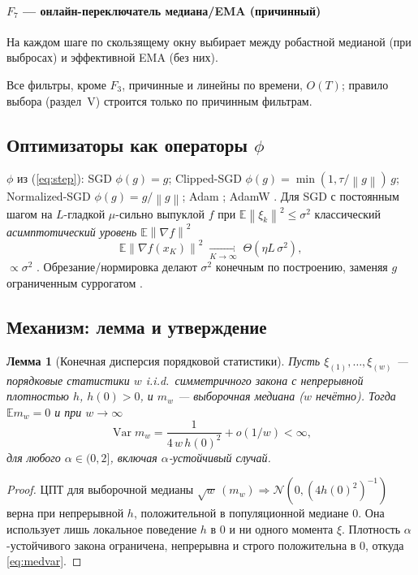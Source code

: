 \documentclass[conference]{IEEEtran}
\theoremstyle{plain}
\newtheorem{lemma}{Лемма}
\theoremstyle{definition}
\newcommand{\E}{\mathbb{E}}
\newcommand{\norm}[1]{\left\lVert#1\right\rVert}
\DeclareMathOperator{\Var}{Var}
\begin{document}
\paragraph*{$F_7$ --- онлайн-переключатель медиана/EMA (причинный)}
На каждом шаге по скользящему окну выбирает между робастной медианой
(при выбросах) и эффективной EMA (без них).

\medskip\noindent
Все фильтры, кроме $F_3$, причинные и линейны по времени, $O(T)$;
правило выбора (раздел~V) строится только по причинным фильтрам.

\subsection{Оптимизаторы как операторы $\phi$}
$\phi$ из (\ref{eq:step}): SGD $\phi(g)=g$; Clipped-SGD
$\phi(g)=\min(1,\tau/\norm{g})\,g$; Normalized-SGD $\phi(g)=g/\norm{g}$;
Adam \cite{kingma2015adam}; AdamW \cite{loshchilov2019adamw}. Для SGD с
постоянным шагом на $L$-гладкой $\mu$-сильно выпуклой $f$ при
$\E\norm{\xi_k}^2\le\sigma^2$ классический \emph{асимптотический уровень} $\E\norm{\nabla f}^2$
\begin{equation}
\E\norm{\nabla f(x_K)}^2\;\xrightarrow[K\to\infty]{}\;
\Theta(\eta L\,\sigma^2), \label{eq:floor}
\end{equation}
$\propto\sigma^2$ \cite{robbins1951sgd}. Обрезание/нормировка делают
$\sigma^2$ конечным по построению, заменяя $g$ ограниченным суррогатом
\cite{gorbunov2020clipping,cutkosky2021high,armacki2024nonlinear}.

\subsection{Механизм: лемма и утверждение}

\begin{lemma}[Конечная дисперсия порядковой статистики]
\label{lem:median}
Пусть $\xi_{(1)},\dots,\xi_{(w)}$ --- порядковые статистики $w$ i.i.d.\
симметричного закона с непрерывной плотностью $h$, $h(0)>0$, и $m_w$ ---
выборочная медиана ($w$ нечётно). Тогда $\E m_w=0$ и при $w\to\infty$
\begin{equation}
\Var m_w=\frac{1}{4\,w\,h(0)^2}+o(1/w)<\infty,
\label{eq:medvar}
\end{equation}
для \emph{любого} $\alpha\in(0,2]$, включая $\alpha$-устойчивый случай.
\end{lemma}
\begin{proof}
ЦПТ для выборочной медианы $\sqrt{w}\,(m_w)\Rightarrow
\mathcal N(0,(4h(0)^2)^{-1})$ верна при непрерывной $h$, положительной
в популяционной медиане $0$. Она использует лишь локальное поведение
$h$ в $0$ и ни одного момента $\xi$. Плотность $\alpha$-устойчивого
закона ограничена, непрерывна и строго положительна в $0$, откуда
\eqref{eq:medvar}.
\end{proof}
\end{document}
